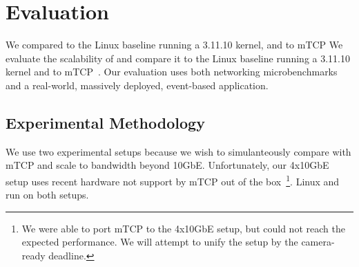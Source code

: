 
\section{Evaluation}
\label{sec:eval}

We compared \ix to the Linux baseline running a 3.11.10 kernel, and to
mTCP We evaluate the scalability of \ix and compare it to the Linux
baseline running a 3.11.10 kernel and to mTCP~\cite{jeong2014mtcp}. 
Our evaluation uses both networking microbenchmarks and a real-world,
massively deployed, event-based application. 



\subsection{Experimental Methodology}
\label{sec:eval:setup}

We use two experimental setups because we wish to simulanteously
compare with mTCP and scale to bandwidth beyond 10GbE.  Unfortunately,
our 4x10GbE setup uses recent hardware not support by mTCP out of the
box~\footnote{We were able to port mTCP to the 4x10GbE setup, but
  could not reach the expected performance.  We will attempt to unify
  the setup by the camera-ready deadline.}. Linux and \ix run on both
setups.



